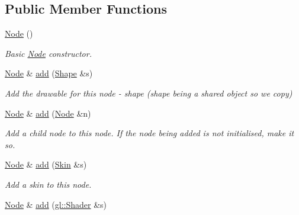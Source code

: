 \subsection*{Public Member Functions}
\begin{DoxyCompactItemize}
\item 
\hypertarget{classs9_1_1Node_ad7a34779cad45d997bfd6d3d8043c75f}{\hyperlink{classs9_1_1Node_ad7a34779cad45d997bfd6d3d8043c75f}{Node} ()}\label{classs9_1_1Node_ad7a34779cad45d997bfd6d3d8043c75f}

\begin{DoxyCompactList}\small\item\em Basic \hyperlink{classs9_1_1Node}{Node} constructor. \end{DoxyCompactList}\item 
\hyperlink{classs9_1_1Node}{Node} \& \hyperlink{classs9_1_1Node_ac44580d62b43ded65eca763eb380eb9c}{add} (\hyperlink{classs9_1_1Shape}{Shape} \&s)
\begin{DoxyCompactList}\small\item\em Add the drawable for this node -\/ shape (shape being a shared object so we copy) \end{DoxyCompactList}\item 
\hypertarget{classs9_1_1Node_afcba0c1ba679104bc51398ca8c8cf524}{\hyperlink{classs9_1_1Node}{Node} \& \hyperlink{classs9_1_1Node_afcba0c1ba679104bc51398ca8c8cf524}{add} (\hyperlink{classs9_1_1Node}{Node} \&n)}\label{classs9_1_1Node_afcba0c1ba679104bc51398ca8c8cf524}

\begin{DoxyCompactList}\small\item\em Add a child node to this node. If the node being added is not initialised, make it so. \end{DoxyCompactList}\item 
\hypertarget{classs9_1_1Node_a7cb3d603d9fb0db8be71c637b0d11b33}{\hyperlink{classs9_1_1Node}{Node} \& \hyperlink{classs9_1_1Node_a7cb3d603d9fb0db8be71c637b0d11b33}{add} (\hyperlink{classs9_1_1Skin}{Skin} \&s)}\label{classs9_1_1Node_a7cb3d603d9fb0db8be71c637b0d11b33}

\begin{DoxyCompactList}\small\item\em Add a skin to this node. \end{DoxyCompactList}\item 
\hypertarget{classs9_1_1Node_aa71a2da0e324bc6890a06f122c8767aa}{\hyperlink{classs9_1_1Node}{Node} \& \hyperlink{classs9_1_1Node_aa71a2da0e324bc6890a06f122c8767aa}{add} (\hyperlink{classs9_1_1gl_1_1Shader}{gl\-::\-Shader} \&s)}\label{classs9_1_1Node_aa71a2da0e324bc6890a06f122c8767aa}


\end{DoxyCompactItemize}
